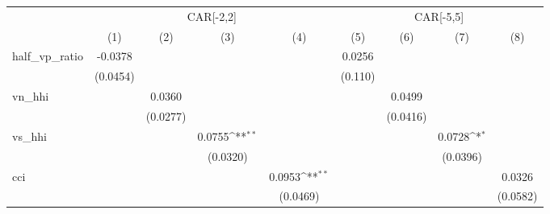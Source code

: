 {
\def\sym#1{\ifmmode^{#1}\else\(^{#1}\)\fi}
\begin{tabular}{l*{8}{c}}
\toprule
                    &\multicolumn{4}{c}{CAR[-2,2]}                                                          &\multicolumn{4}{c}{CAR[-5,5]}                                                          \\
                    &\multicolumn{1}{c}{(1)}         &\multicolumn{1}{c}{(2)}         &\multicolumn{1}{c}{(3)}         &\multicolumn{1}{c}{(4)}         &\multicolumn{1}{c}{(5)}         &\multicolumn{1}{c}{(6)}         &\multicolumn{1}{c}{(7)}         &\multicolumn{1}{c}{(8)}         \\
\midrule
half\_vp\_ratio       &     -0.0378         &                     &                     &                     &      0.0256         &                     &                     &                     \\
                    &    (0.0454)         &                     &                     &                     &     (0.110)         &                     &                     &                     \\
vn\_hhi              &                     &      0.0360         &                     &                     &                     &      0.0499         &                     &                     \\
                    &                     &    (0.0277)         &                     &                     &                     &    (0.0416)         &                     &                     \\
vs\_hhi              &                     &                     &      0.0755\sym{**} &                     &                     &                     &      0.0728\sym{*}  &                     \\
                    &                     &                     &    (0.0320)         &                     &                     &                     &    (0.0396)         &                     \\
cci                 &                     &                     &                     &      0.0953\sym{**} &                     &                     &                     &      0.0326         \\
                    &                     &                     &                     &    (0.0469)         &                     &                     &                     &    (0.0582)         \\

\end{tabular}}
